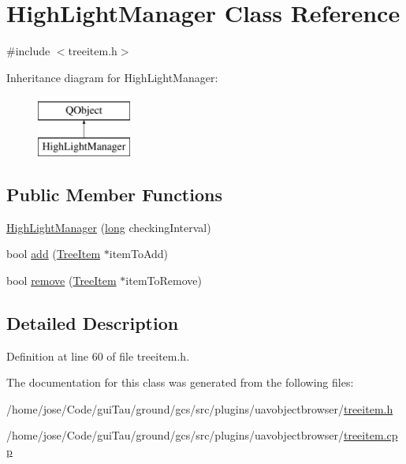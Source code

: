 \hypertarget{class_high_light_manager}{\section{High\-Light\-Manager Class Reference}
\label{class_high_light_manager}
}


{\ttfamily \#include $<$treeitem.\-h$>$}

Inheritance diagram for High\-Light\-Manager\-:\begin{figure}[H]
\begin{center}
\leavevmode
\includegraphics[height=2.000000cm]{class_high_light_manager}
\end{center}
\end{figure}
\subsection*{Public Member Functions}
\begin{DoxyCompactItemize}
\item 
\hyperlink{group___u_a_v_object_browser_plugin_ga263177a5340ddcc0e376da4c0d40399a}{High\-Light\-Manager} (\hyperlink{ioapi_8h_a3c7b35ad9dab18b8310343c201f7b27e}{long} checking\-Interval)
\item 
bool \hyperlink{group___u_a_v_object_browser_plugin_ga61c9f35430a5668bcab80f6840ea0f93}{add} (\hyperlink{class_tree_item}{Tree\-Item} $\ast$item\-To\-Add)
\item 
bool \hyperlink{group___u_a_v_object_browser_plugin_gac8c19321b7e84ad6ba7a857cf48b21a8}{remove} (\hyperlink{class_tree_item}{Tree\-Item} $\ast$item\-To\-Remove)
\end{DoxyCompactItemize}


\subsection{Detailed Description}


Definition at line 60 of file treeitem.\-h.



The documentation for this class was generated from the following files\-:\begin{DoxyCompactItemize}
\item 
/home/jose/\-Code/gui\-Tau/ground/gcs/src/plugins/uavobjectbrowser/\hyperlink{treeitem_8h}{treeitem.\-h}\item 
/home/jose/\-Code/gui\-Tau/ground/gcs/src/plugins/uavobjectbrowser/\hyperlink{treeitem_8cpp}{treeitem.\-cpp}\end{DoxyCompactItemize}
